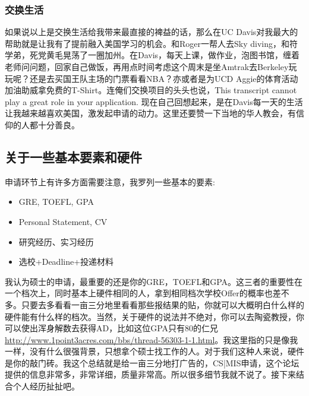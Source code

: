 \subsubsection{交换生活}
如果说以上是交换生活给我带来最直接的裨益的话，那么在UC Davis对我最大的帮助就是让我有了提前融入美国学习的机会。和Roger一帮人去Sky diving，和符学弟，死党黄毛晃荡了一圈加州。在Davis，每天上课，做作业，泡图书馆，缠着老师问问题，回家自己做饭，再用点时间考虑这个周末是坐Amtrak去Berkeley玩玩呢？还是去买国王队主场的门票看看NBA？亦或者是为UCD Aggie的体育活动加油助威拿免费的T-Shirt。连俺们交换项目的头头也说，This transcript cannot play a great role in your application. 现在自己回想起来，是在Davis每一天的生活让我越来越喜欢美国，激发起申请的动力。这里还要赞一下当地的华人教会，有信仰的人都十分善良。\par
\subsection{关于一些基本要素和硬件}
申请环节上有许多方面需要注意，我罗列一些基本的要素:
\begin{itemize}
\item GRE, TOEFL, GPA
\item Personal Statement, CV
\item 研究经历、实习经历
\item 选校+Deadline+投递材料
\end{itemize}
\par
我认为硕士的申请，最重要的还是你的GRE，TOEFL和GPA。这三者的重要性在一个档次上，同时基本上硬件相同的人，拿到相同档次学校Offer的概率也差不多。只要去多看看一亩三分地里看看那些报结果的贴，你就可以大概明白什么样的硬件能有什么样的档次。当然，关于硬件的说法并不绝对，你可以去陶瓷教授，你可以使出浑身解数去获得AD，比如这位GPA只有80的仁兄 \url{http://www.1point3acres.com/bbs/thread-56303-1-1.html}。我这里指的只是像我一样，没有什么很强背景，只想拿个硕士找工作的人。对于我们这种人来说，硬件是你的敲门砖。我这个总结就是给一亩三分地打广告的，CS|MIS申请，这个论坛提供的信息非常多，非常详细，质量非常高。所以很多细节我就不说了。接下来结合个人经历扯扯吧。
